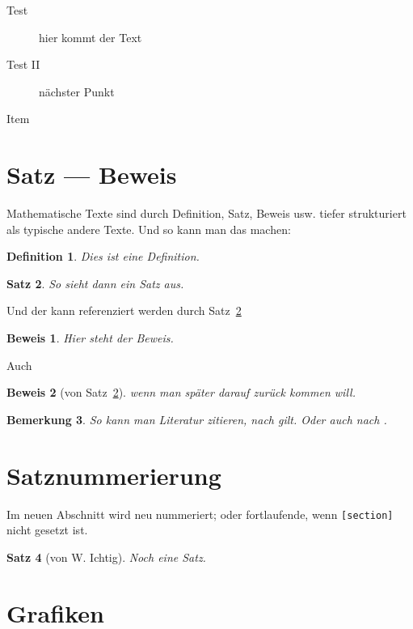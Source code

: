 \documentclass[12pt]{scrartcl}%
\newtheorem{satz}{Satz}[section] %
\newtheorem{bemerkung}[satz]{Bemerkung}
\newtheorem{definition}[satz]{Definition} %
\theoremstyle{nonumberplain}
\newtheorem{beweis}{Beweis}
\begin{document}
\begin{description}
\item [Test] hier kommt der Text
\item[Test II] nächster Punkt
\item[Item] 
\end{description}

\section{Satz --- Beweis}

Mathematische Texte sind durch Definition, Satz, Beweis usw. tiefer
strukturiert als typische andere Texte. Und so kann man das machen:

\begin{definition}
  Dies ist eine Definition.
\end{definition}


\begin{satz}\label{s:satz1}
  So sieht dann ein Satz aus.
\end{satz}

Und der kann referenziert werden durch Satz~\ref{s:satz1} 

\begin{beweis}
  Hier steht der Beweis.
\end{beweis}

Auch

\begin{beweis}[von Satz~\ref{s:satz1}]
  wenn man später darauf zurück kommen will.
\end{beweis}


\begin{bemerkung}
So kann man Literatur zitieren, nach \cite{Heu03} gilt. Oder auch
nach  \cite[35.6]{Heu03}. 

\cite{GM-GM}
\end{bemerkung}


\section{Satznummerierung}

Im neuen Abschnitt wird neu nummeriert; oder fortlaufende, wenn
\texttt{[section]} nicht gesetzt ist.

\begin{satz}[von W. Ichtig]
  Noch eine Satz.
\end{satz}


\section{Grafiken}
\end{document}
